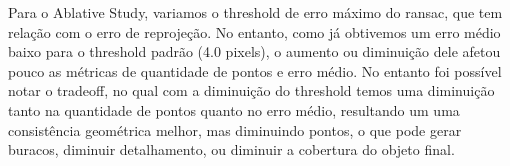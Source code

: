 \documentclass[12pt]{article}
\begin{document}
Para o Ablative Study, variamos o threshold de erro máximo do ransac, que tem relação com o erro de reprojeção. No entanto, como já obtivemos um erro médio baixo para o threshold padrão (4.0 pixels), o aumento ou diminuição dele afetou pouco as métricas de quantidade de pontos e erro médio. No entanto foi possível notar o tradeoff, no qual com a diminuição do threshold temos uma diminuição tanto na quantidade de pontos quanto no erro médio, resultando um uma consistência geométrica melhor, mas diminuindo pontos, o que pode gerar buracos, diminuir detalhamento, ou diminuir a cobertura do objeto final.






\end{document}
